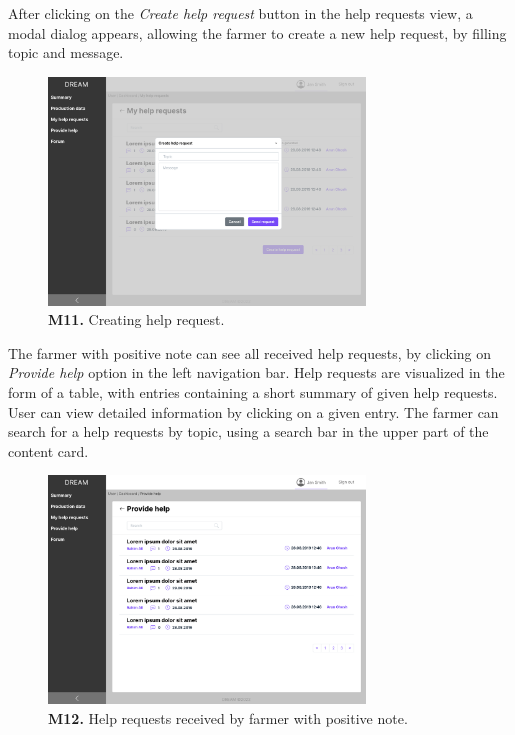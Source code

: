 After clicking on the \textit{Create help request} button in the help requests view, a modal dialog appears, allowing the farmer to create a new help request, by filling topic and message.
\begin{figure}[H]
    \centering
    \includegraphics[width=0.75\textwidth]{mockups/Farmer_Dashboard_My help requests_Create help request.png}
    \caption{\textbf{M11.} Creating help request.}
\end{figure}

The farmer with positive note can see all received help requests, by clicking on \textit{Provide help} option in the left navigation bar. Help requests are visualized in the form of a table, with entries containing a short summary of given help requests. User can view detailed information by clicking on a given entry. The farmer can search for a help requests by topic, using a search bar in the upper part of the content card.
\begin{figure}[H]
    \centering
    \includegraphics[width=0.75\textwidth]{mockups/Farmer_Dashboard_Provide help.png}
    \caption{\textbf{M12.} Help requests received by farmer with positive note.}
    \label{fig:farmer-provide-help}
\end{figure}


